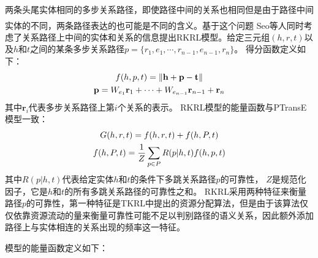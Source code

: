 \documentclass[twocolumn]{article}
\newcommand{\upcite}[1]{\textsuperscript{\textsuperscript{\cite{#1}}}}
\begin{document}
两条头尾实体相同的多步关系路径，即使路径中间的关系也相同但是由于路径中间实体的不同，两条路径表达的也可能是不同的含义。基于这个问题
Seo等人\upcite{RKRL}同时考虑了关系路径上中间的实体和关系的信息提出RKRL模型。给定三元组$(h,r,t)$以及$h$和$t$之间的某条多步关系路径$p=\{r_1,e_1,\cdots,r_{n-1},e_{n-1},r_n\}$。
得分函数定义如下：
\begin{gather}
	f(h,p,t)=\left \|\textbf{h}+\textbf{p}-\textbf{t} \right \| \notag \\
	\textbf{p}=W_{e_1}\textbf{r}_1+\cdots+W_{e_{n-1}}\textbf{r}_{n-1}+\textbf{r}_n \notag
\end{gather}
其中$\textbf{r}_i$代表多步关系路径上第$i$个关系的表示。
RKRL模型的能量函数与PTransE模型一致：
\begin{gather}
	G(h,r,t)=f(h,r,t)+f(h,P,t)  \notag \\ 
	f(h,P,t)=\frac{1}{Z}\sum_{p\in P}R(p|h,t)f(h,p,t) \notag
\end{gather}
其中$R(p|h,t)$代表给定实体$h$和$t$的条件下多跳关系路径$p$的可靠性，
$Z$是规范化因子，它是$h$和$t$的所有多跳关系路径的可靠性之和。
RKRL采用两种特征来衡量路径$p$的可靠性，第一种特征是TKRL中提出的资源分配算法，但是由于该算法仅仅依靠资源流动的量来衡量可靠性可能不足以判别路径的语义关系，因此额外添加路径上与实体相连的关系出现的频率这一特征。

模型的能量函数定义如下：



\printbibliography
\end{document}
